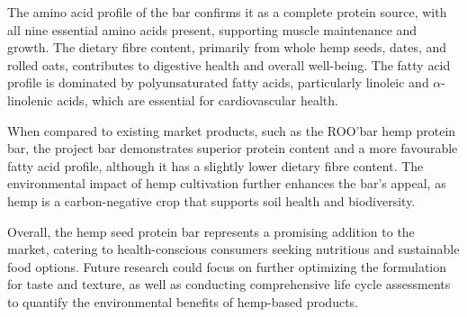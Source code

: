 \vspace{1em}
The amino acid profile of the bar confirms it as a complete protein source, with all nine essential amino acids present, supporting muscle maintenance and growth. The dietary fibre content, primarily from whole hemp seeds, dates, and rolled oats, contributes to digestive health and overall well-being. The fatty acid profile is dominated by polyunsaturated fatty acids, particularly linoleic and $\alpha$-linolenic acids, which are essential for cardiovascular health.

\vspace{1em}
When compared to existing market products, such as the ROO'bar hemp protein bar, the project bar demonstrates superior protein content and a more favourable fatty acid profile, although it has a slightly lower dietary fibre content. The environmental impact of hemp cultivation further enhances the bar's appeal, as hemp is a carbon-negative crop that supports soil health and biodiversity.

\vspace{1em}
Overall, the hemp seed protein bar represents a promising addition to the market, catering to health-conscious consumers seeking nutritious and sustainable food options. Future research could focus on further optimizing the formulation for taste and texture, as well as conducting comprehensive life cycle assessments to quantify the environmental benefits of hemp-based products.

